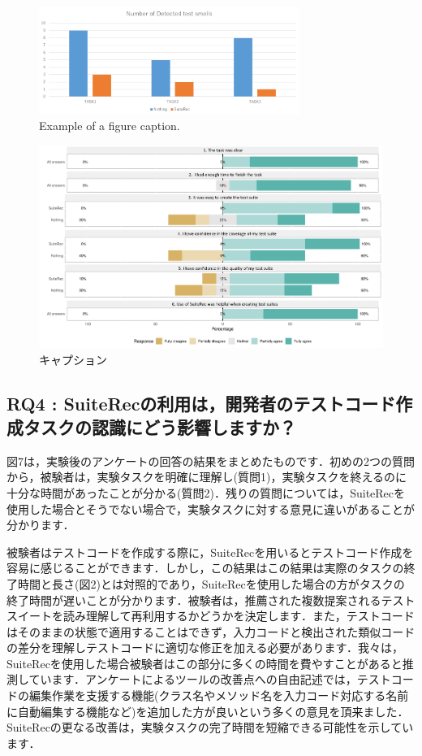 \documentclass[conference]{IEEEtran}
\begin{document}
\begin{figure}[htbp]
\centerline{\includegraphics[width=8.5cm]{testsmell.pdf}}
\caption{Example of a figure caption.}
\label{fig}
\end{figure}

\begin{figure}[t]
 \begin{center}
  \includegraphics[width=18.5cm]{suiterec-expt.pdf}
  \caption{キャプション}
  \label{}
 \end{center}
\end{figure}

\subsection{RQ4 : SuiteRecの利用は，開発者のテストコード作成タスクの認識にどう影響しますか？}

図7は，実験後のアンケートの回答の結果をまとめたものです．初めの2つの質問から，被験者は，実験タスクを明確に理解し(質問1)，実験タスクを終えるのに十分な時間があったことが分かる(質問2)．残りの質問については，SuiteRecを使用した場合とそうでない場合で，実験タスクに対する意見に違いがあることが分かります．

被験者はテストコードを作成する際に，SuiteRecを用いるとテストコード作成を容易に感じることができます．しかし，この結果はこの結果は実際のタスクの終了時間と長さ(図2)とは対照的であり，SuiteRecを使用した場合の方がタスクの終了時間が遅いことが分かります．被験者は，推薦された複数提案されるテストスイートを読み理解して再利用するかどうかを決定します．また，テストコードはそのままの状態で適用することはできず，入力コードと検出された類似コードの差分を理解しテストコードに適切な修正を加える必要があります．我々は，SuiteRecを使用した場合被験者はこの部分に多くの時間を費やすことがあると推測しています．アンケートによるツールの改善点への自由記述では，テストコードの編集作業を支援する機能(クラス名やメソッド名を入力コード対応する名前に自動編集する機能など)を追加した方が良いという多くの意見を頂来ました．SuiteRecの更なる改善は，実験タスクの完了時間を短縮できる可能性を示しています．
\end{document}
